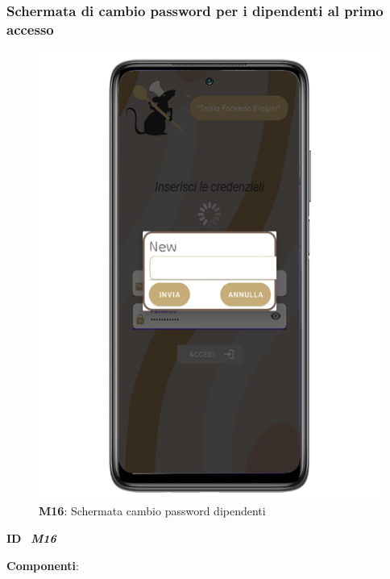                 \subsubsection{Schermata di cambio password per i dipendenti al primo accesso}
                    \begin{figure}[H]
                      \centering
                      \includegraphics[scale=2]{assets/Mockup/Mockup_WorkerChangePass.png}
                      \caption*{\textbf{M16}: Schermata cambio password dipendenti}\label{fig:Mockup_WorkerChangePass}
                    \end{figure}
          
                    \begin{flushleft}
                      \textbf{ID}   \ \Large{\textit{\textbf{M16}}}
                    \end{flushleft}
          
                    \textbf{Componenti}:
                    
